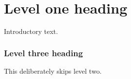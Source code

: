 \documentclass[11pt]{article}
\begin{document}
\section{Level one heading}
Introductory text.
\subsubsection{Level three heading}
This deliberately skips level two.
\end{document}
